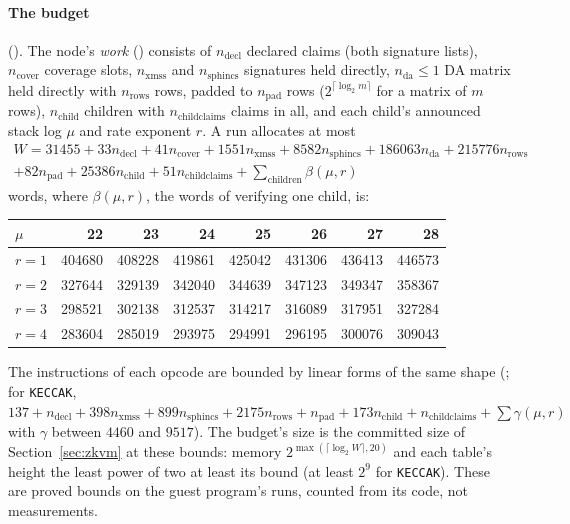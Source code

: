\documentclass[11pt]{article}
\newcommand{\cnt}[1]{n_{\mathrm{#1}}}
\begin{document}
\paragraph{The budget} (). The node's \emph{work} () consists of $\cnt{decl}$
declared claims (both signature lists), $\cnt{cover}$ coverage slots, $\cnt{xmss}$ and $\cnt{sphincs}$
signatures held directly, $\cnt{da} \le 1$ DA matrix held directly with $\cnt{rows}$ rows, padded to
$\cnt{pad}$ rows ($2^{\lceil\log_2 m\rceil}$ for a matrix of $m$ rows), $\cnt{child}$ children
with $\cnt{childclaims}$ claims in all,
and each child's announced stack log $\mu$ and rate exponent $r$. A run allocates at most
\begin{multline*}
W = 31455 + 33\cnt{decl} + 41\cnt{cover} + 1551\cnt{xmss} + 8582\cnt{sphincs} + 186063\cnt{da}
  + 215776\cnt{rows} \\ + 82\cnt{pad} + 25386\cnt{child} + 51\cnt{childclaims}
  + \sum_{\text{children}} \beta(\mu, r)
\end{multline*}
words, where $\beta(\mu,r)$, the words of verifying one child, is:
\begin{center}\small
\begin{tabular}{l|rrrrrrr}
$\mu$ & 22 & 23 & 24 & 25 & 26 & 27 & 28\\\hline
$r=1$ & 404680 & 408228 & 419861 & 425042 & 431306 & 436413 & 446573\\
$r=2$ & 327644 & 329139 & 342040 & 344639 & 347123 & 349347 & 358367\\
$r=3$ & 298521 & 302138 & 312537 & 314217 & 316089 & 317951 & 327284\\
$r=4$ & 283604 & 285019 & 293975 & 294991 & 296195 & 300076 & 309043
\end{tabular}
\end{center}
The instructions of each opcode are bounded by linear forms of the same shape
(; for \texttt{KECCAK}, $137 + \cnt{decl} + 398\cnt{xmss} + 899\cnt{sphincs} +
2175\cnt{rows} + \cnt{pad} + 173\cnt{child} + \cnt{childclaims} + \sum \gamma(\mu, r)$ with
$\gamma$ between $4460$ and $9517$). The
budget's size is the committed size of Section~\ref{sec:zkvm} at these bounds: memory
$2^{\max(\lceil\log_2 W\rceil, 20)}$ and each table's height the least power of two at least its
bound (at least $2^9$ for \texttt{KECCAK}). These are proved bounds on the guest program's runs,
counted from its code, not measurements.
\end{document}
